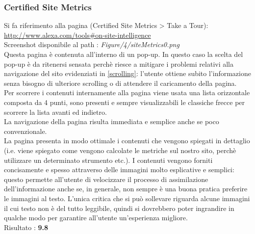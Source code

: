 \subsubsection{Certified Site Metrics}\label{metrics}
Si fa riferimento alla pagina (Certified Site Metrics > Take a Tour): \\
\url{http://www.alexa.com/tools#on-site-intelligence}
\\
Screenshot disponibile al path : \textit{Figure/4/siteMetrics0.png} \\ 
Questa pagina è contenuta all'interno di un pop-up.
In questo caso la scelta del pop-up è da ritenersi sensata perchè riesce a 
mitigare i problemi relativi alla navigazione del sito evidenziati in 
\ref{scrolling}: l'utente ottiene subito l'informazione senza
bisogno di ulteriore scrolling o di attendere il caricamento della pagina.\\
Per scorrere i contenuti internamente alla pagina viene usata una lista
 orizzontale composta da 4 punti, sono presenti e sempre
visualizzabili le classiche frecce per scorrere la lista avanti ed indietro. \\
La navigazione della pagina risulta immediata e semplice anche se poco
convenzionale. \\
La pagina presenta in modo ottimale i contenuti che vengono spiegati in 
dettaglio (i.e. viene spiegato come vengono calcolate le metriche sul
nostro sito, perchè utilizzare un determinato strumento etc.). I contenuti vengono
forniti concisamente e spesso attraverso delle immagini molto esplicative e
semplici: questo permette all'utente di velocizzare il processo di assimilazione
dell'informazione anche se, in generale, non sempre è una buona pratica 
preferire le immagini al testo. L'unica critica che si può sollevare riguarda
alcune immagini il cui testo non è del tutto leggibile, quindi si dovrebbero
poter ingrandire in qualche modo per garantire all'utente un'esperienza migliore.
 \\
Risultato : \textbf{9.8}